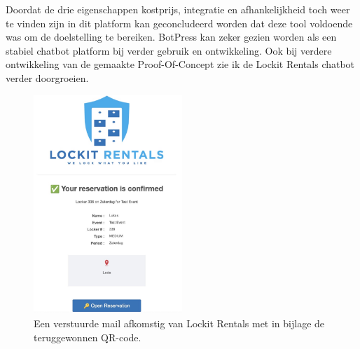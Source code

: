 Doordat de drie eigenschappen kostprijs, integratie en afhankelijkheid toch weer te vinden zijn in dit platform kan geconcludeerd worden dat deze tool voldoende was om de doelstelling te bereiken. BotPress kan zeker gezien worden als een stabiel chatbot platform bij verder gebruik en ontwikkeling. Ook bij verdere ontwikkeling van de gemaakte Proof-Of-Concept zie ik de Lockit Rentals chatbot verder doorgroeien.



\begin{figure}[h]
    \centering
    \includegraphics[width=0.5\textwidth]{graphics/F34_mailQR-code.jpg}
    \captionsetup{justification=centering, singlelinecheck=false}
    
    \caption{Een verstuurde mail afkomstig van Lockit Rentals met in bijlage de teruggewonnen QR-code.}
    \label{fig:resultatEmailQR-code}
\end{figure}












